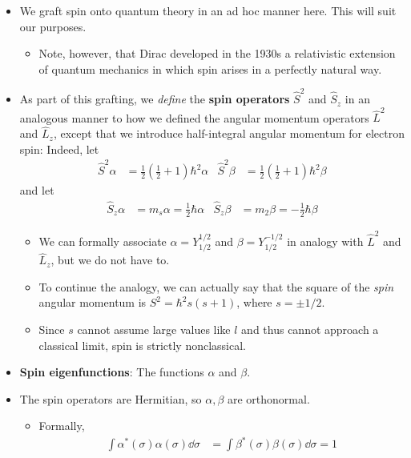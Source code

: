 \documentclass[../notes.tex]{subfiles}
\begin{document}
\begin{itemize}
\begin{itemize}
    \end{itemize}
    \item We graft spin onto quantum theory in an ad hoc manner here. This will suit our purposes.
    \begin{itemize}
        \item Note, however, that Dirac developed in the 1930s a relativistic extension of quantum mechanics in which spin arises in a perfectly natural way.
    \end{itemize}
    \item As part of this grafting, we \emph{define} the \textbf{spin operators} $\hat{S}^2$ and $\hat{S}_z$ in an analogous manner to how we defined the angular momentum operators $\hat{L}^2$ and $\hat{L}_z$, except that we introduce half-integral angular momentum for electron spin: Indeed, let
    \begin{align*}
        \hat{S}^2\alpha &= \frac{1}{2}\left( \frac{1}{2}+1 \right)\hbar^2\alpha&
        \hat{S}^2\beta  &= \frac{1}{2}\left( \frac{1}{2}+1 \right)\hbar^2\beta
    \end{align*}
    and let
    \begin{align*}
        \hat{S}_z\alpha &= m_s\alpha = \frac{1}{2}\hbar\alpha&
        \hat{S}_z\beta  &= m_2\beta  = -\frac{1}{2}\hbar\beta
    \end{align*}
    \begin{itemize}
        \item We can formally associate $\alpha=Y_{1/2}^{1/2}$ and $\beta=Y_{1/2}^{-1/2}$ in analogy with $\hat{L}^2$ and $\hat{L}_z$, but we do not have to.
        \item To continue the analogy, we can actually say that the square of the \emph{spin} angular momentum is $S^2=\hbar^2s(s+1)$, where $s=\pm 1/2$.
        \item Since $s$ cannot assume large values like $l$ and thus cannot approach a classical limit, spin is strictly nonclassical.
    \end{itemize}
    \item \textbf{Spin eigenfunctions}: The functions $\alpha$ and $\beta$.
    \item The spin operators are Hermitian, so $\alpha,\beta$ are orthonormal.
    \begin{itemize}
        \item Formally,
        \begin{align*}
            \int\alpha^*(\sigma)\alpha(\sigma)\dd{\sigma} &= \int\beta^*(\sigma)\beta(\sigma)\dd{\sigma} = 1\\

\end{align*}
\end{itemize}
\end{itemize}
\end{document}
